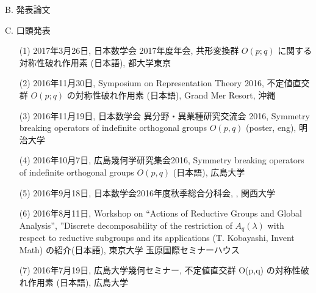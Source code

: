 \documentclass[a4j,twocolumn]{jarticle}
\begin{document}
\vspace{0.2cm}


\noindent
B. 発表論文

\vspace{0.1cm}


\vspace{0.2cm}
\noindent
C. 口頭発表

\vspace{0.1cm}
\begin{enumerate}
	\item[(1)] 
2017年3月26日, 日本数学会 2017年度年会, 共形変換群 $O( p;q )$ に関する対称性破れ作用素 (日本語), 都大学東京
	\item[(2)] 
2016年11月30日, Symposium on Representation Theory 2016, 不定値直交群 $O ( p; q )$ の対称性破れ作用素 (日本語), Grand Mer Resort, 沖縄
	\item[(3)] 
2016年11月19日, 日本数学会 異分野・異業種研究交流会 2016, Symmetry breaking operators of indefinite orthogonal groups $O(p,q)$ (poster, eng), 明治大学
	\item[(4)] 
2016年10月7日, 広島幾何学研究集会2016, Symmetry breaking operators of indefinite orthogonal groups $O(p,q)$ (日本語), 広島大学
	\item[(5)] 
2016年9月18日, 日本数学会2016年度秋季総合分科会, , 関西大学
	\item[(6)] 
2016年8月11日, Workshop on “Actions of Reductive Groups and Global Analysis”, ”Discrete decomposability of the restriction of $A_q(\lambda)$ with respect to reductive subgroups and its applications (T. Kobayashi, Invent Math) の紹介(日本語), 東京大学 玉原国際セミナーハウス
	\item[(7)] 
2016年7月19日, 広島大学幾何セミナー, 不定値直交群 O(p,q) の対称性破れ作用素 (日本語), 広島大学
\end{enumerate}
\end{document}
